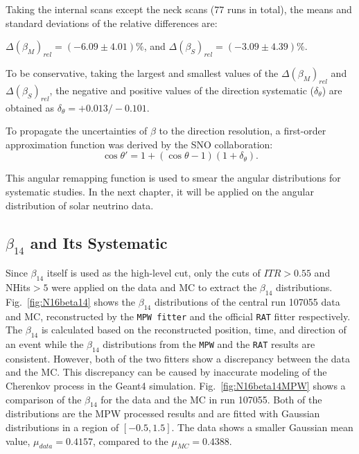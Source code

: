 Taking the internal scans except the neck scans (77 runs in total), the means and standard deviations of the relative differences are:

$\Delta(\beta_M)_{rel}=(-6.09\pm4.01)\%$, and $\Delta(\beta_S)_{rel}=(-3.09\pm4.39)\%$.

To be conservative, taking the largest and smallest values of the $\Delta(\beta_M)_{rel}$ and $\Delta(\beta_S)_{rel}$, the negative and positive values of the direction systematic ($\delta_\theta$) are obtained as $\delta_\theta=+0.013/-0.101$.

To propagate the uncertainties of $\beta$ to the direction resolution, a first-order approximation function was derived by the SNO collaboration\cite{drouin2012three}:
\begin{equation}\label{remapTheta}
\cos\theta'=1+(\cos\theta-1)(1+\delta_{\theta}).
\end{equation} 

This angular remapping function is used to smear the angular distributions for systematic studies. In the next chapter, it will be applied on the angular distribution of solar neutrino data. 

\subsection{$\beta_{14}$ and Its Systematic}
Since $\beta_{14}$ itself is used as the high-level cut, only the cuts of $ITR>0.55$ and NHits$>5$ were applied on the data and MC to extract the $\beta_{14}$ distributions.
Fig.~\ref{fig:N16beta14} shows the $\beta_{14}$ distributions of the central run 107055 data and MC, reconstructed by the \texttt{MPW fitter} and the official \texttt{RAT} fitter respectively. The $\beta_{14}$ is calculated based on the reconstructed position, time, and direction of an event while the $\beta_{14}$ distributions from the \texttt{MPW} and the \texttt{RAT} results are consistent. However, both of the two fitters show a discrepancy between the data and the MC. This discrepancy can be caused by inaccurate modeling of the Cherenkov process in the Geant4 simulation\cite{dunmore2004separation,beta14discrepancy}.
Fig.~\ref{fig:N16beta14MPW} shows a comparison of the $\beta_{14}$ for the data and the MC in run 107055. Both of the distributions are the MPW processed results and are fitted with Gaussian distributions in a region of $[-0.5,1.5]$. The data shows a smaller Gaussian mean value, $\mu_{data}=0.4157$, compared to the $\mu_{MC}=0.4388$.

